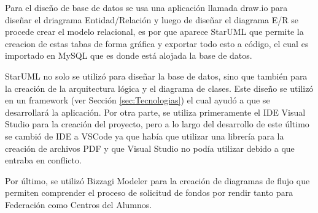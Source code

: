 Para el diseño de base de datos se usa una aplicación llamada draw.io para diseñar el driagrama Entidad/Relación y luego de diseñar el diagrama E/R se procede crear el modelo relacional, es por que aparece StarUML que permite la creacion de estas tabas de forma gráfica y exportar todo esto a código, el cual es importado en MySQL que es donde está alojada la base de datos.

StarUML no solo se utilizó para diseñar la base de datos, sino que también para la creación de la arquitectura lógica y el diagrama de clases. Este diseño se utilizó en un framework (ver Sección \ref{sec:Tecnologias}) el cual ayudó a que se desarrollará la aplicación.  Por otra parte, se utiliza primeramente el IDE Visual Studio para la creación del proyecto, pero a lo largo del desarrollo de este último se cambió de IDE a VSCode ya que había que utilizar una librería para la creación de archivos PDF y que Visual Studio no podía utilizar debido a que entraba en conflicto.

Por último, se utilizó Bizzagi Modeler para la creación de diagramas de flujo que permiten comprender el proceso de solicitud de fondos por rendir tanto para Federación como Centros del Alumnos.